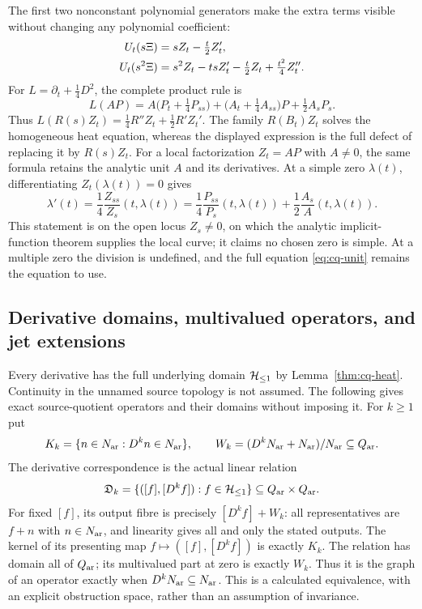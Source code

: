 The first two nonconstant polynomial generators make the extra terms
visible without changing any polynomial coefficient:
\begin{align}\label{eq:cq-generators}
 U_t(s\Xi)&=sZ_t-\tfrac t2Z_t',\notag\\
 U_t(s^2\Xi)&=s^2Z_t-t sZ_t'-\tfrac t2Z_t+\tfrac{t^2}4Z_t''.
\end{align}
For $L=\partial_t+\tfrac14D^2$, the complete product rule is
\begin{equation}\label{eq:cq-unit}
 L(AP)=A\bigl(P_t+\tfrac14P_{ss}\bigr)
       +\bigl(A_t+\tfrac14A_{ss}\bigr)P
       +\tfrac12A_sP_s.
\end{equation}
Thus $L(R(s)Z_t)=\tfrac14R''Z_t+\tfrac12R'Z_t'$.
The family $R(B_t)Z_t$ solves the homogeneous heat equation, whereas
the displayed expression is the full defect of replacing it by
$R(s)Z_t$. For a local factorization $Z_t=AP$ with $A\ne0$,
the same formula retains the analytic unit $A$ and its derivatives.
At a simple zero $\lambda(t)$, differentiating
$Z_t(\lambda(t))=0$ gives
\begin{equation}\label{eq:cq-zero}
 \lambda'(t)=\frac14\frac{Z_{ss}}{Z_s}(t,\lambda(t))
 =\frac14\frac{P_{ss}}{P_s}(t,\lambda(t))
    +\frac12\frac{A_s}{A}(t,\lambda(t)).
\end{equation}
This statement is on the open locus $Z_s\ne0$, on which the analytic
implicit-function theorem supplies the local curve; it claims no
chosen zero is simple. At a multiple zero the division is undefined,
and the full equation \eqref{eq:cq-unit} remains the equation to use.

\subsection{Derivative domains, multivalued operators, and jet extensions}
\label{sec:cq-jets}
Every derivative has the full underlying domain $\mathcal H_{\leq 1}$ by
Lemma~\ref{thm:cq-heat}. Continuity in the unnamed source topology is
not assumed. The following gives exact source-quotient operators and
their domains without imposing it. For $k\geq1$ put
\[
 K_k=\{n\in N_{\rm ar}:D^kn\in N_{\rm ar}\},\qquad
 W_k=(D^kN_{\rm ar}+N_{\rm ar})/N_{\rm ar}\subseteq Q_{\rm ar}.
\]
The derivative correspondence is the actual linear relation
\begin{equation}\label{eq:cq-relation}
 \mathfrak D_k=\{([f],[D^kf]):f\in\mathcal H_{\leq 1}\}
                    \subseteq Q_{\rm ar}\times Q_{\rm ar}.
\end{equation}
For fixed $[f]$, its output fibre is precisely $[D^kf]+W_k$:
all representatives are $f+n$ with $n\in N_{\rm ar}$, and linearity gives
all and only the stated outputs. The kernel of its presenting map
$f\mapsto([f],[D^kf])$ is exactly $K_k$. The relation has domain
all of $Q_{\rm ar}$; its multivalued part at zero is exactly $W_k$.
Thus it is the graph of an operator exactly when $D^kN_{\rm ar}\subseteq
N_{\rm ar}$. This is a calculated equivalence, with an explicit obstruction
space, rather than an assumption of invariance.


